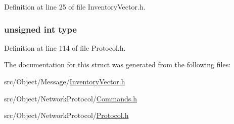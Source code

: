 Definition at line 25 of file InventoryVector.h.

\hypertarget{struct_inventory_vector_a4bfea42429249a1f65204f0c0f34704a}{
\subsubsection[{type}]{\setlength{\rightskip}{0pt plus 5cm}unsigned int {\bf type}}}
\label{struct_inventory_vector_a4bfea42429249a1f65204f0c0f34704a}


Definition at line 114 of file Protocol.h.



The documentation for this struct was generated from the following files:\begin{DoxyCompactItemize}
\item 
src/Object/Message/\hyperlink{_inventory_vector_8h}{InventoryVector.h}\item 
src/Object/NetworkProtocol/\hyperlink{_commands_8h}{Commands.h}\item 
src/Object/NetworkProtocol/\hyperlink{_protocol_8h}{Protocol.h}\end{DoxyCompactItemize}
